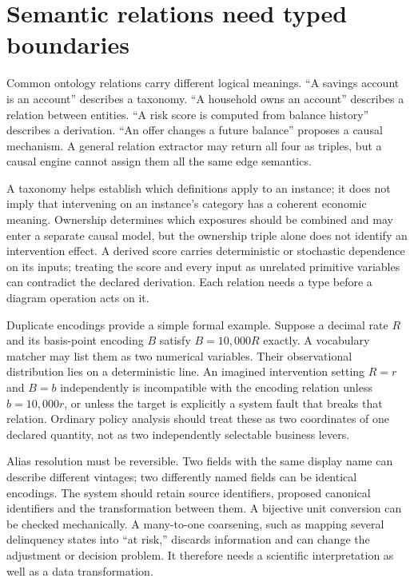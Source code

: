 \hypertarget{semantic-relations-need-typed-boundaries}{%
\section{Semantic relations need typed
boundaries}\label{semantic-relations-need-typed-boundaries}}

Common ontology relations carry different logical meanings. ``A savings
account is an account'' describes a taxonomy. ``A household owns an
account'' describes a relation between entities. ``A risk score is
computed from balance history'' describes a derivation. ``An offer
changes a future balance'' proposes a causal mechanism. A general
relation extractor may return all four as triples, but a causal engine
cannot assign them all the same edge semantics.

A taxonomy helps establish which definitions apply to an instance; it
does not imply that intervening on an instance's category has a coherent
economic meaning. Ownership determines which exposures should be
combined and may enter a separate causal model, but the ownership triple
alone does not identify an intervention effect. A derived score carries
deterministic or stochastic dependence on its inputs; treating the score
and every input as unrelated primitive variables can contradict the
declared derivation. Each relation needs a type before a diagram
operation acts on it.

Duplicate encodings provide a simple formal example. Suppose a decimal
rate \(R\) and its basis-point encoding \(B\) satisfy \(B=10{,}000R\)
exactly. A vocabulary matcher may list them as two numerical variables.
Their observational distribution lies on a deterministic line. An
imagined intervention setting \(R=r\) and \(B=b\) independently is
incompatible with the encoding relation unless \(b=10{,}000r\), or
unless the target is explicitly a system fault that breaks that
relation. Ordinary policy analysis should treat these as two coordinates
of one declared quantity, not as two independently selectable business
levers.

Alias resolution must be reversible. Two fields with the same display
name can describe different vintages; two differently named fields can
be identical encodings. The system should retain source identifiers,
proposed canonical identifiers and the transformation between them. A
bijective unit conversion can be checked mechanically. A many-to-one
coarsening, such as mapping several delinquency states into ``at risk,''
discards information and can change the adjustment or decision problem.
It therefore needs a scientific interpretation as well as a data
transformation.

